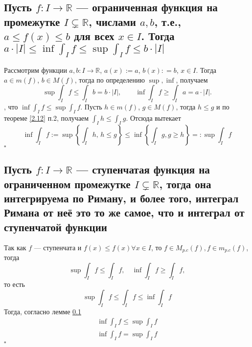 \documentclass[a4paper]{article}
\newcommand{\qed}{\hfill$\square$}
\begin{document}
\subsection{Пусть $f:I \to \mathbb{R}$ — ограниченная функция на промежутке $I \subsetneq \mathbb{R}$, числами $a,b$, т.е., $a \leqslant f(x) \leqslant b$ для всех $x \in I$. Тогда $a\cdot |I| \leqslant \inf \int_I f  \leqslant \sup \int_I f \leqslant b \cdot |I|$}
\label{2.13}
Рассмотрим функции $a,b:I \to \mathbb{R}$, $a(x) := a$, $b(x): =b$, $x\in I$. Тогда $a \in m(f)$, $b \in M(f)$, тогда по определению $\sup, \inf$, получаем
$$
\sup \int_I f\le \int_I b = b \cdot |I|, \qquad \inf \int_I f \ge \int_I a = a\cdot |I|.
$$
, что $\inf \int_I f \leqslant \sup \int_I f$. Пусть $h\in m(f)$, $g\in M(f)$, тогда $h \leqslant g$ и по теореме \ref{2.12} п.2, получаем $\int_I h \leqslant \int_I g$. Отсюда вытекает
$$
\inf \int_I f :=\sup \left\{ \int_I h, \, h \leqslant g \right\} \leqslant \inf\left\{\int_I g, g\geqslant h\right\}=:\sup\int_I f
$$\qed

\subsection{Пусть $f:I\rightarrow\mathbb{R}$ — ступенчатая функция на ограниченном промежутке $I\subsetneq\mathbb{R}$, тогда она интегрируема по Риману, и более того, интеграл Римана от неё это то же самое, что и интеграл от ступенчатой функции}
\label{2.14}
Так как $f$ — ступенчата и $f(x)\leqslant f(x)\forall x\in I$, то $f\in M_{p.c}(f), f\in m_{p.c}(f)$, тогда
$$\sup\int_I f\leqslant\int_I f,\quad \inf\int_I f\geqslant\int_I f,$$
то есть
$$\sup\int_I f\leqslant\int_I f\leqslant\inf\int_I f$$
Тогда, согласно лемме \ref{2.13}
$$\begin{aligned}
    \inf\int_I f\leqslant\sup\int_I f\\
    \inf\int_I f=\sup\int_I f
\end{aligned}$$\qed
\end{document}
